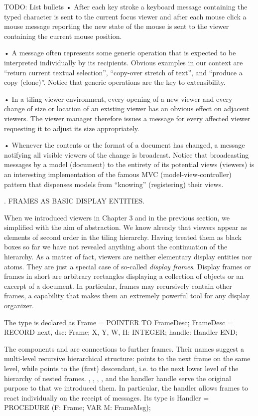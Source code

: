 TODO: List bullets
• After each key stroke a keyboard message containing the typed character is sent to the current focus viewer and after each mouse click a mouse message reporting the new state of the mouse is sent to the viewer containing the current mouse position.

• A message often represents some generic operation that is expected to be interpreted individually by its recipients. Obvious examples in our context are ``return current textual selection'', ``copy-over stretch of text'', and ``produce a copy (clone)''. Notice that generic operations are the key to extensibility.

• In a tiling viewer environment, every opening of a new viewer and every change of size or location of an existing viewer has an obvious effect on adjacent viewers. The viewer manager therefore issues a message for every affected viewer requesting it to adjust its size appropriately.

• Whenever the contents or the format of a document has changed, a message notifying all visible viewers of the change is broadcast. Notice that broadcasting messages by a model (document) to the entirety of its potential views (viewers) is an interesting implementation of the famous MVC (model-view-controller) pattern that dispenses models from ``knowing'' (registering) their views.

. FRAMES AS BASIC DISPLAY ENTITIES.

When we introduced viewers in Chapter 3 and in the previous section,
we simplified with the aim of abstraction. We know already that
viewers appear as elements of second order in the tiling
hierarchy. Having treated them as black boxes so far we have not
revealed anything about the continuation of the hierarchy. As a matter
of fact, viewers are neither elementary display entities nor
atoms. They are just a special case of so-called \emph{display frames}. Display frames or frames in short are arbitrary rectangles
displaying a collection of objects or an excerpt of a document. In
particular, frames may recursively contain other frames, a capability
that makes them an extremely powerful tool for any display organizer.

The type  is declared as
\begintt
Frame = POINTER TO FrameDesc;
FrameDesc = RECORD
  next, dsc: Frame;
  X, Y, W, H: INTEGER;
  handle: Handler
END;
\endtt

\noindent The components  and  are connections to further frames. Their
names suggest a multi-level recursive hierarchical structure: 
points to the next frame on the same level, while  points to the
(first) descendant, i.e. to the next lower level of the hierarchy of
nested frames. , , , , and the handler handle serve the original
purpose to that we introduced them. In particular, the handler allows
frames to react individually on the receipt of messages. Its type is
\begintt
Handler = PROCEDURE (F: Frame; VAR M: FrameMsg);
\endtt

